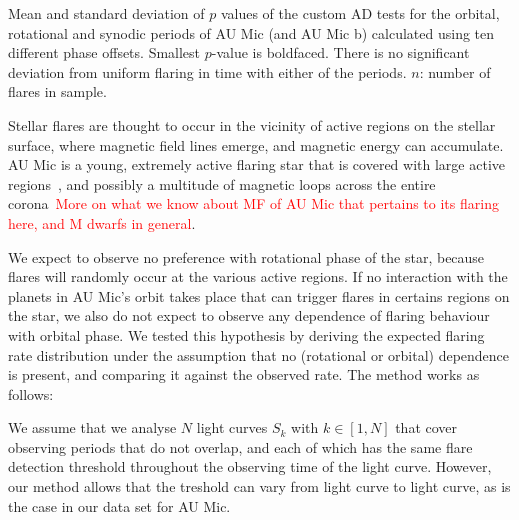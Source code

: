 \documentclass[fleqn,usenatbib,letters]{mnras}%
\begin{document}
\begin{table}
\caption{Mean and standard deviation of $p$ values of the custom AD tests for the orbital, rotational and synodic periods of AU Mic (and AU Mic b) calculated using ten different phase offsets. Smallest $p$-value is boldfaced. There is no significant deviation from uniform flaring in time with either of the periods. $n$: number of flares in sample.}
\centering

\label{tab:pvals}
\end{table}

Stellar flares are thought to occur in the vicinity of active regions on the stellar surface, where magnetic field lines emerge, and magnetic energy can accumulate. AU Mic is a young, extremely active flaring star that is covered with large active regions~\citep{linsky1994, kochukhov2020, plavchan2020}, and possibly a multitude of magnetic loops across the entire corona~\citep{cranmer2013}\textcolor{red}{More on what we know about MF of AU Mic that pertains to its flaring here, and M dwarfs in general}. 

We expect to observe no preference with rotational phase of the star, because flares will randomly occur at the various active regions. If no interaction with the planets in AU Mic's orbit takes place that can trigger flares in certains regions on the star, we also do not expect to observe any dependence of flaring behaviour with orbital phase. We tested this hypothesis by deriving the expected flaring rate distribution under the assumption that no (rotational or orbital) dependence is present, and comparing it against the observed rate. The method works as follows:

We assume that we analyse $N$ light curves $S_k$ with $k\in [1,N]$ that cover observing periods that do not overlap, and each of which has the same flare detection threshold throughout the observing time of the light curve. However, our method allows that the treshold can vary from light curve to light curve, as is the case in our data set for AU Mic.
 
\end{document}
